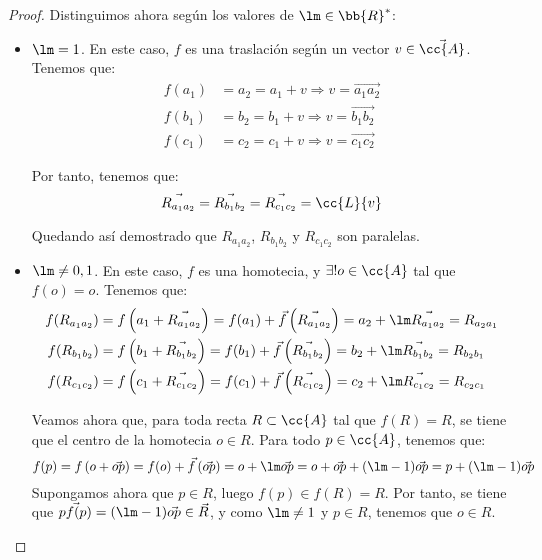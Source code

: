 \begin{proof}
    Distinguimos ahora según los valores de $\lm\in \bb{R}^\ast$:
    \begin{itemize}
        \item $\lm=1$. En este caso, $f$ es una traslación según un vector $v\in \vec{\cc{A}}$. Tenemos que:
        \begin{align*}
            f(a_1) &= a_2 = a_1 + v \Longrightarrow v = \vec{a_1a_2} \\
            f(b_1) &= b_2 = b_1 + v \Longrightarrow v = \vec{b_1b_2} \\
            f(c_1) &= c_2 = c_1 + v \Longrightarrow v = \vec{c_1c_2}
        \end{align*}

        Por tanto, tenemos que:
        \begin{equation*}
            \vec{R_{a_1a_2}} = \vec{R_{b_1b_2}} = \vec{R_{c_1c_2}} = \cc{L}\{v\}
        \end{equation*}

        Quedando así demostrado que $R_{a_1a_2}$, $R_{b_1b_2}$ y $R_{c_1c_2}$ son paralelas.

        \item $\lm\neq 0,1$. En este caso, $f$ es una homotecia, y $\exists! o\in \cc{A}$ tal que $f(o)=o$. Tenemos que:
        \begin{align*}
            f(R_{a_1a_2}) &= f\left(a_1 + \vec{R_{a_1a_2}}\right) = f(a_1) + \vec{f}\left(\vec{R_{a_1a_2}}\right) = a_2 + \lm \vec{R_{a_1a_2}} = R_{a_2a_1} \\
            f(R_{b_1b_2}) &= f\left(b_1 + \vec{R_{b_1b_2}}\right) = f(b_1) + \vec{f}\left(\vec{R_{b_1b_2}}\right) = b_2 + \lm \vec{R_{b_1b_2}} = R_{b_2b_1} \\
            f(R_{c_1c_2}) &= f\left(c_1 + \vec{R_{c_1c_2}}\right) = f(c_1) + \vec{f}\left(\vec{R_{c_1c_2}}\right) = c_2 + \lm \vec{R_{c_1c_2}} = R_{c_2c_1}
        \end{align*}

        Veamos ahora que, para toda recta $R\subset \cc{A}$ tal que $f(R)=R$, se tiene que el centro de la homotecia $o\in R$. Para todo $p\in \cc{A}$, tenemos que:
        \begin{equation*}
            f(p) = f\left(o+\vec{op}\right) = f(o) + \vec{f}\left(\vec{op}\right) = o + \lm \vec{op}
            = o + \vec{op} + (\lm-1)\vec{op} = p + (\lm-1)\vec{op}
        \end{equation*}
        Supongamos ahora que $p\in R$, luego $f(p)\in f(R)=R$.
        Por tanto, se tiene que $\vec{pf(p)}=(\lm -1)\vec{op}\in \vec{R}$, y como $\lm\neq 1$ y $p\in R$, tenemos que $o\in R$.


\end{itemize}
\end{proof}
